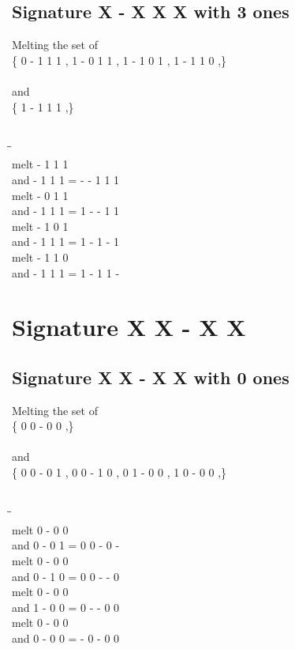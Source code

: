 \documentclass{article}
\begin{document}
\subsection{Signature X - X X X with 3 ones}
Melting the set of\\
\{ 0  -  1  1  1 , 1  -  0  1  1 , 1  -  1  0  1 , 1  -  1  1  0 ,\}\\\\
and\\
\{ 1  -  1  1  1 ,\}\\\\
\begin{tabbing}
\hspace{3cm}\=\hspace{3cm}\=\hspace{3cm}\\[1cm]
melt  -  1  1  1 \\
and  -  1  1  1 \>
 =  -  -  1  1  1 \\[1mm]
melt  -  0  1  1 \\
and  -  1  1  1 \>
 =  1  -  -  1  1 \\[1mm]
melt  -  1  0  1 \\
and  -  1  1  1 \>
 =  1  -  1  -  1 \\[1mm]
melt  -  1  1  0 \\
and  -  1  1  1 \>
 =  1  -  1  1  - \\[1mm]
\end{tabbing}
\newpage
\section{Signature X X - X X }
\subsection{Signature X X - X X with 0 ones}
Melting the set of\\
\{ 0  0  -  0  0 ,\}\\\\
and\\
\{ 0  0  -  0  1 , 0  0  -  1  0 , 0  1  -  0  0 , 1  0  -  0  0 ,\}\\\\
\begin{tabbing}
\hspace{3cm}\=\hspace{3cm}\=\hspace{3cm}\\[1cm]
melt  0  -  0  0 \\
and  0  -  0  1 \>
 =  0  0  -  0  - \\[1mm]
melt  0  -  0  0 \\
and  0  -  1  0 \>
 =  0  0  -  -  0 \\[1mm]
melt  0  -  0  0 \\
and  1  -  0  0 \>
 =  0  -  -  0  0 \\[1mm]
melt  0  -  0  0 \\
and  0  -  0  0 \>
 =  -  0  -  0  0 \\[1mm]
\end{tabbing}
\newpage
\end{document}
